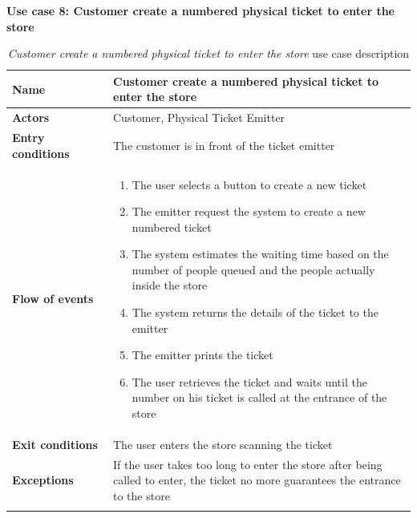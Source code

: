 \clearpage
\textbf{Use case 8: Customer create a numbered physical ticket to enter the store}
\smallskip
{}
\begin{longtable}{p{0.25\linewidth}p{0.75\linewidth}}
    \toprule
    \textbf{Name}             & \textbf{Customer create a numbered physical ticket to enter the store}                                                             \\
    \midrule
    \textbf{Actors}           & Customer, Physical Ticket Emitter                                                                                                  \\
    \midrule
    \textbf{Entry conditions} & The customer is in front of the ticket emitter                                                                                     \\
    \midrule
    \textbf{Flow of events}   &
    \begin{enumerate}
        \item The user selects a button to create a new ticket
        \item The emitter request the system to create a new numbered ticket
        \item The system estimates the waiting time based on the number of people queued and the people actually inside the store
        \item The system returns the details of the ticket to the emitter
        \item The emitter prints the ticket
        \item The user retrieves the ticket and waits until the number on his ticket is called at the entrance of the store
    \end{enumerate}                                                                                                                                     \\
    \midrule
    \textbf{Exit conditions}  & The user enters the store scanning the ticket                                                                                      \\
    \midrule
    \textbf{Exceptions}       & If the user takes too long to enter the store after being called to enter, the ticket no more guarantees the entrance to the store \\
    \bottomrule
    \caption{\emph{Customer create a numbered physical ticket to enter the store} use case description}
\end{longtable}

